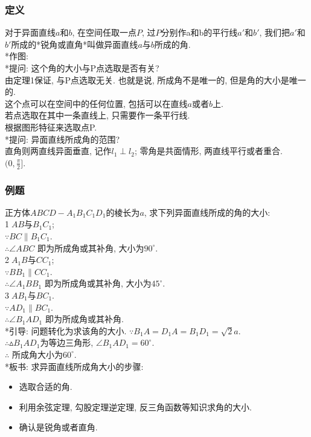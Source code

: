 \documentclass{article}
\begin{document}
\begin{CJK}{UTF8}{gkai}
\subsubsection{定义}
对于异面直线$a$和$b$, 在空间任取一点$P$, 过$P$分别作a和b的平行线$a'$和$b'$, 我们把$a'$和$b'$所成的*锐角或直角*叫做异面直线$a$与$b$所成的角.\\
*作图:\\
*提问: 这个角的大小与P点选取是否有关?\\
由定理1保证, 与P点选取无关. 也就是说, 所成角不是唯一的, 但是角的大小是唯一的.\\
这个点可以在空间中的任何位置, 包括可以在直线$a$或者$b$上.\\
若点选取在其中一条直线上, 只需要作一条平行线.\\
根据图形特征来选取点P.\\
\newline
*提问: 异面直线所成角的范围?\\
直角则两直线异面垂直, 记作$l_1\perp l_2$; 零角是共面情形, 两直线平行或者重合. \\
$(0, \frac{\pi}{2}]$.

\subsubsection{例题}
正方体$ABCD-A_1B_1C_1D_1$的棱长为$a$, 求下列异面直线所成的角的大小:\\
\textcircled{1}$AB$与$B_1C_1$;\\
$\because BC \parallel B_1C_1$.\\
$\therefore \angle ABC$ 即为所成角或其补角, 大小为$90^ \circ$.\\
\textcircled{2}$A_1B$与$CC_1$;\\
$\because BB_1 \parallel CC_1$.\\
$\therefore \angle A_1BB_1$ 即为所成角或其补角, 大小为$45^ \circ$.\\
\textcircled{3}$AB_1$与$BC_1$.\\
$\because AD_1 \parallel BC_1$.\\
$\therefore \angle B_1AD_1$ 即为所成角或其补角.\\
*引导: 问题转化为求该角的大小.
$\because B_1A = D_1A = B_1D_1 = \sqrt{2}a$.\\
$\therefore \vartriangle B_1AD_1$为等边三角形, $\angle B_1AD_1 = 60^ \circ$.\\
$\therefore$ 所成角大小为$60^ \circ$.\\
\newline
*板书: 求异面直线所成角大小的步骤:\\
\begin{itemize}
\item 选取合适的角.
\item 利用余弦定理, 勾股定理逆定理, 反三角函数等知识求角的大小.
\item 确认是锐角或者直角.
\end{itemize}


\end{CJK}
\end{document}
